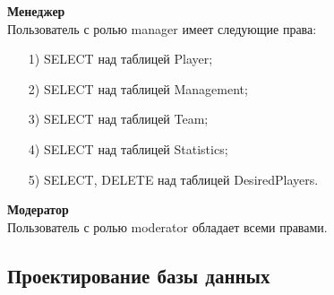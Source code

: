\textbf{Менеджер}\\
Пользователь с ролью manager имеет следующие права:
\begin{itemize}
	\item[1)] SELECT над таблицей Player;
	\item[2)] SELECT над таблицей Management; 
	\item[3)] SELECT над таблицей Team;
	\item[4)] SELECT над таблицей Statistics;
	\item[5)] SELECT, DELETE над таблицей DesiredPlayers.    
\end{itemize}
\textbf{Модератор}\\
Пользователь с ролью moderator обладает всеми правами.

\subsection{Проектирование базы данных}
